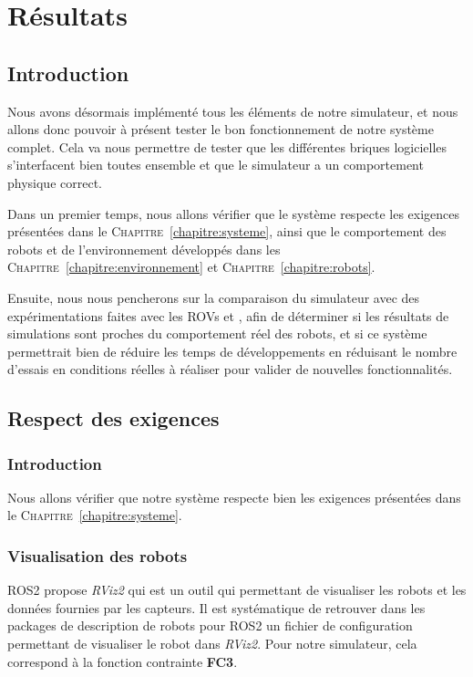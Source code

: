 \chapter{Résultats}
\label{chapter:resultats}
	
	\section{Introduction}

		Nous avons désormais implémenté tous les éléments de notre simulateur, et nous allons donc pouvoir à présent tester le bon fonctionnement de notre système complet. Cela va nous permettre de tester que les différentes briques logicielles s'interfacent bien toutes ensemble et que le simulateur a un comportement physique correct.
		
		Dans un premier temps, nous allons vérifier que le système respecte les exigences présentées dans le \textsc{Chapitre}~\ref{chapitre:systeme}, ainsi que le comportement des robots et de l'environnement développés dans les \textsc{Chapitre}~\ref{chapitre:environnement} et \textsc{Chapitre}~\ref{chapitre:robots}.

		Ensuite, nous nous pencherons sur la comparaison du simulateur avec des expérimentations faites avec les \gls{ROV}s \argos{} et \atoll{}, afin de déterminer si les résultats de simulations sont proches du comportement réel des robots, et si ce système permettrait bien de réduire les temps de développements en réduisant le nombre d'essais en conditions réelles à réaliser pour valider de nouvelles fonctionnalités.

	\section{Respect des exigences}

		\subsection{Introduction}

			Nous allons vérifier que notre système respecte bien les exigences présentées dans le \textsc{Chapitre}~\ref{chapitre:systeme}.

		\subsection{Visualisation des robots}

			\gls{ROS2} propose \textit{RViz2} qui est un outil qui permettant de visualiser les robots et les données fournies par les capteurs. Il est systématique de retrouver dans les packages de description de robots pour \gls{ROS2} un fichier de configuration permettant de visualiser le robot dans \textit{RViz2}. Pour notre simulateur, cela correspond à la fonction contrainte \textbf{FC3}.

